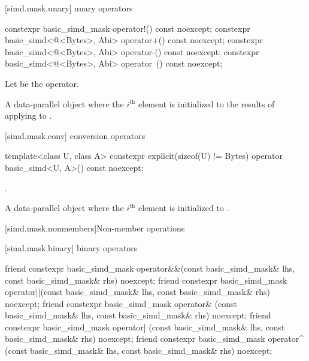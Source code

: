 [simd.mask.unary]{ unary operators}

\begin{itemdecl}
constexpr basic_simd_mask operator!() const noexcept;
constexpr basic_simd<@\integerfrom@<Bytes>, Abi> operator+() const noexcept;
constexpr basic_simd<@\integerfrom@<Bytes>, Abi> operator-() const noexcept;
constexpr basic_simd<@\integerfrom@<Bytes>, Abi> operator~() const noexcept;
\end{itemdecl}

\begin{itemdescr}
  \pnum Let \op{} be the operator.

  \pnum\returns
  A data-parallel object where the $i^\text{th}$ element is initialized to the results of applying
  \op{} to  \foralli.
\end{itemdescr}

[simd.mask.conv]{ conversion operators}

\begin{itemdecl}
template<class U, class A>
  constexpr explicit(sizeof(U) != Bytes) operator basic_simd<U, A>() const noexcept;
\end{itemdecl}

\begin{itemdescr}
  \pnum\constraints
  .

  \pnum\returns
  A data-parallel object where the $i^\text{th}$ element is initialized to
  .
\end{itemdescr}

[simd.mask.nonmembers]{Non-member operations}

[simd.mask.binary]{ binary operators}

\begin{itemdecl}
friend constexpr basic_simd_mask
  operator&&(const basic_simd_mask& lhs, const basic_simd_mask& rhs) noexcept;
friend constexpr basic_simd_mask
  operator||(const basic_simd_mask& lhs, const basic_simd_mask& rhs) noexcept;
friend constexpr basic_simd_mask
  operator& (const basic_simd_mask& lhs, const basic_simd_mask& rhs) noexcept;
friend constexpr basic_simd_mask
  operator| (const basic_simd_mask& lhs, const basic_simd_mask& rhs) noexcept;
friend constexpr basic_simd_mask
  operator^ (const basic_simd_mask& lhs, const basic_simd_mask& rhs) noexcept;
\end{itemdecl}

